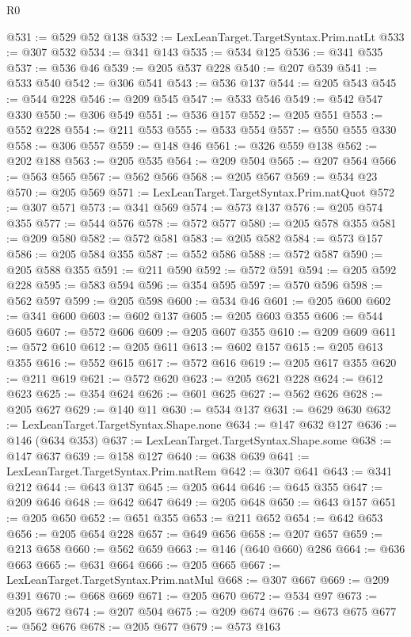 \begin{lexlean}{R0}
\begin{coremodule}
@531 := @529 @52 @138
@532 := LexLeanTarget.TargetSyntax.Prim.natLt
@533 := @307 @532
@534 := @341 @143
@535 := @534 @125
@536 := @341 @535
@537 := @536 @46
@539 := @205 @537 @228
@540 := @207 @539
@541 := @533 @540
@542 := @306 @541
@543 := @536 @137
@544 := @205 @543
@545 := @544 @228
@546 := @209 @545
@547 := @533 @546
@549 := @542 @547 @330
@550 := @306 @549
@551 := @536 @157
@552 := @205 @551
@553 := @552 @228
@554 := @211 @553
@555 := @533 @554
@557 := @550 @555 @330
@558 := @306 @557
@559 := @148 @46
@561 := @326 @559 @138
@562 := @202 @188
@563 := @205 @535
@564 := @209 @504
@565 := @207 @564
@566 := @563 @565
@567 := @562 @566
@568 := @205 @567
@569 := @534 @23
@570 := @205 @569
@571 := LexLeanTarget.TargetSyntax.Prim.natQuot
@572 := @307 @571
@573 := @341 @569
@574 := @573 @137
@576 := @205 @574 @355
@577 := @544 @576
@578 := @572 @577
@580 := @205 @578 @355
@581 := @209 @580
@582 := @572 @581
@583 := @205 @582
@584 := @573 @157
@586 := @205 @584 @355
@587 := @552 @586
@588 := @572 @587
@590 := @205 @588 @355
@591 := @211 @590
@592 := @572 @591
@594 := @205 @592 @228
@595 := @583 @594
@596 := @354 @595
@597 := @570 @596
@598 := @562 @597
@599 := @205 @598
@600 := @534 @46
@601 := @205 @600
@602 := @341 @600
@603 := @602 @137
@605 := @205 @603 @355
@606 := @544 @605
@607 := @572 @606
@609 := @205 @607 @355
@610 := @209 @609
@611 := @572 @610
@612 := @205 @611
@613 := @602 @157
@615 := @205 @613 @355
@616 := @552 @615
@617 := @572 @616
@619 := @205 @617 @355
@620 := @211 @619
@621 := @572 @620
@623 := @205 @621 @228
@624 := @612 @623
@625 := @354 @624
@626 := @601 @625
@627 := @562 @626
@628 := @205 @627
@629 := @140 @11
@630 := @534 @137
@631 := @629 @630
@632 := LexLeanTarget.TargetSyntax.Shape.none
@634 := @147 @632 @127
@636 := @146 (@634 @353)
@637 := LexLeanTarget.TargetSyntax.Shape.some
@638 := @147 @637
@639 := @158 @127
@640 := @638 @639
@641 := LexLeanTarget.TargetSyntax.Prim.natRem
@642 := @307 @641
@643 := @341 @212
@644 := @643 @137
@645 := @205 @644
@646 := @645 @355
@647 := @209 @646
@648 := @642 @647
@649 := @205 @648
@650 := @643 @157
@651 := @205 @650
@652 := @651 @355
@653 := @211 @652
@654 := @642 @653
@656 := @205 @654 @228
@657 := @649 @656
@658 := @207 @657
@659 := @213 @658
@660 := @562 @659
@663 := @146 (@640 @660) @286
@664 := @636 @663
@665 := @631 @664
@666 := @205 @665
@667 := LexLeanTarget.TargetSyntax.Prim.natMul
@668 := @307 @667
@669 := @209 @391
@670 := @668 @669
@671 := @205 @670
@672 := @534 @97
@673 := @205 @672
@674 := @207 @504
@675 := @209 @674
@676 := @673 @675
@677 := @562 @676
@678 := @205 @677
@679 := @573 @163

\end{coremodule}
\end{lexlean}

